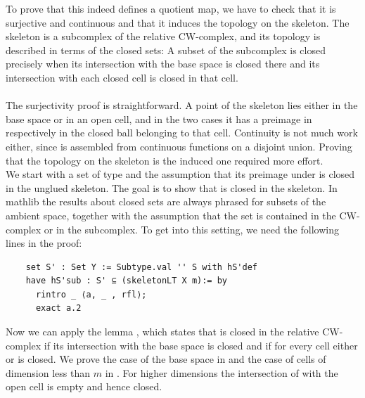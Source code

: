 \documentclass[11pt, a4paper, english]{article}
\theoremstyle{plain}
\theoremstyle{definition}
\theoremstyle{remark}
\numberwithin{equation}{section}
\numberwithin{theorem}{section}
\begin{document}
To prove that this indeed defines a quotient map, we have to check that it is surjective and continuous and that it induces the topology on the skeleton. The skeleton is a subcomplex of the relative CW-complex, and its topology is described in terms of the closed sets: A subset of the subcomplex is closed precisely when its intersection with the base space is closed there and its intersection with each closed cell is closed in that cell. \\
\\ 
The surjectivity proof is straightforward. A point of the skeleton lies either in the base space or in an open cell, and in the two cases it has a preimage in  respectively in the closed ball belonging to that cell. Continuity is not much work either, since  is assembled from continuous functions on a disjoint union. Proving that the topology on the skeleton is the induced one required more effort. \\

We start with a set  of type  and the assumption that its preimage under  is closed in the unglued skeleton. The goal is to show that  is closed in the skeleton. In mathlib the results about closed sets are always phrased for subsets of the ambient space, together with the assumption that the set is contained in the CW-complex or in the subcomplex. To get into this setting, we need the following lines in the proof: 
\begin{verbatim}
    set S' : Set Y := Subtype.val '' S with hS'def
    have hS'sub : S' ⊆ (skeletonLT X m):= by
      rintro _ ⟨a, _ , rfl⟩;
      exact a.2
\end{verbatim}

Now we can apply the lemma , which states that  is closed in the relative CW-complex if its intersection with the base space is closed and if for every cell either  or  is closed. We prove the case of the base space in  and the case of cells of dimension less than $m$ in . For higher dimensions the intersection of  with the open cell is empty and hence closed. \\
\end{document}
